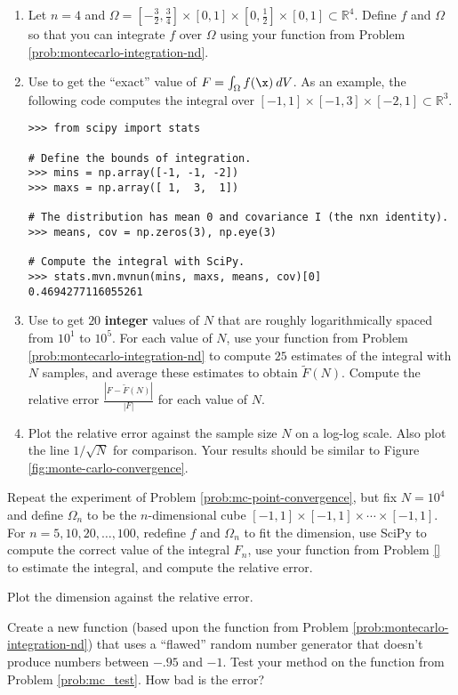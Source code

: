 \begin{enumerate}
\item Let $n=4$ and $\Omega=[-\frac{3}{2}, \frac{3}{4}]\times[0,1]\times[0, \frac{1}{2}]\times[0,1] \subset \mathbb{R}^4$.
Define $f$ and $\Omega$ so that you can integrate $f$ over $\Omega$ using your function from Problem \ref{prob:montecarlo-integration-nd}.

\item Use  to get the ``exact'' value of $F = \int_\Omega f(\x)\:dV$.
As an example, the following code computes the integral over $[-1,1]\times [-1,3]\times[-2,1] \subset \mathbb{R}^3$.
\begin{lstlisting}
>>> from scipy import stats

# Define the bounds of integration.
>>> mins = np.array([-1, -1, -2])
>>> maxs = np.array([ 1,  3,  1])

# The distribution has mean 0 and covariance I (the nxn identity).
>>> means, cov = np.zeros(3), np.eye(3)

# Compute the integral with SciPy.
>>> stats.mvn.mvnun(mins, maxs, means, cov)[0]
0.4694277116055261
\end{lstlisting}

\item Use  to get $20$ \textbf{integer} values of $N$ that are roughly logarithmically spaced from $10^1$ to $10^5$.
For each value of $N$, use your function from Problem \ref{prob:montecarlo-integration-nd} to compute $25$ estimates of the integral with $N$ samples, and average these estimates to obtain $\tilde{F}(N)$.
Compute the relative error $\frac{|F - \tilde{F}(N)|}{|F|}$ for each value of $N$.

\item Plot the relative error against the sample size $N$ on a log-log scale.
Also plot the line $1/\sqrt{N}$ for comparison.
Your results should be similar to Figure \ref{fig:monte-carlo-convergence}.
\end{enumerate}

Repeat the experiment of Problem \ref{prob:mc-point-convergence}, but fix $N=10^4$ and define $\Omega_n$ to be the $n$-dimensional cube $[-1,1]\times[-1,1]\times\cdots\times[-1,1]$.
For $n=5,10,20,\ldots,100$, redefine $f$ and $\Omega_n$ to fit the dimension, use SciPy to compute the correct value of the integral $F_n$, use your function from Problem \ref{} to estimate the integral, and compute the relative error.

Plot the dimension against the relative error.

Create a new function (based upon the function from Problem \ref{prob:montecarlo-integration-nd}) that uses a ``flawed'' random number generator that doesn't produce numbers between $-.95$ and $-1$.
Test your method on the function from Problem \ref{prob:mc_test}.
How bad is the error?
\label{prob:mc_flawed}
